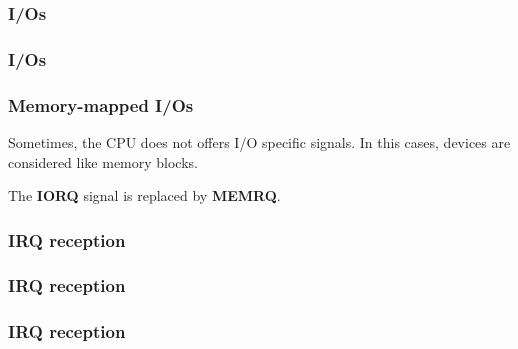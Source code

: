 
\begin{frame}
  \frametitle{I/Os}

  \begin{center}
  \end{center}

\end{frame}


\begin{frame}
  \frametitle{I/Os}

  \begin{center}
  \end{center}

\end{frame}


\begin{frame}
  \frametitle{Memory-mapped I/Os}

  Sometimes, the CPU does not offers I/O specific signals. In this
  cases, devices are considered like memory blocks.

  \-

  The \textbf{IORQ} signal is replaced by \textbf{MEMRQ}.

\end{frame}


\begin{frame}
  \frametitle{IRQ reception}

  \begin{center}
  \end{center}

\end{frame}


\begin{frame}
  \frametitle{IRQ reception}

  \begin{center}
  \end{center}

\end{frame}


\begin{frame}
  \frametitle{IRQ reception}

  \begin{center}
  \end{center}

\end{frame}

